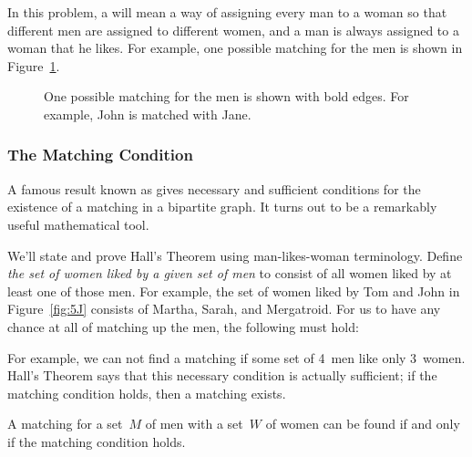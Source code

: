 In this problem, a  will mean a way of assigning every
man to a woman so that different men are assigned to different women,
and a man is always assigned to a woman that he likes.  For example,
one possible matching for the men is shown in Figure~\ref{fig:5K}.

\begin{figure}



\caption{One possible matching for the men is shown with bold edges.
  For example, John is matched with Jane.}

\label{fig:5K}

\end{figure}

\subsubsection{The Matching Condition}

A famous result known as  gives necessary
and sufficient conditions for the existence of a matching in a
bipartite graph.  It turns out to be a remarkably useful mathematical
tool.

We'll state and prove Hall's Theorem using man-likes-woman
terminology.  Define \emph{the set of women liked by a given set of
  men} to consist of all women liked by at least one of those men.
For example, the set of women liked by Tom and John in
Figure~\ref{fig:5J} consists of Martha, Sarah, and Mergatroid.  For us
to have any chance at all of matching up the men, the following
 must hold:

\medskip

\noindent{}

\medskip

For example, we can not find a matching if some set of 4~men like only
3~women.  Hall's Theorem says that this necessary condition is
actually sufficient; if the matching condition holds, then a matching
exists.

\begin{theorem}\label{thm:matching}
  A matching for a set~$M$ of men with a set~$W$ of women can be found if
  and only if the matching condition holds.
\end{theorem}

